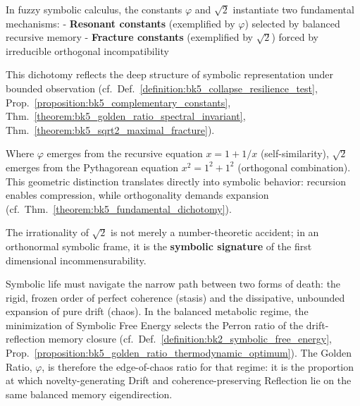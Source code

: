 \begin{theorem}
\label{theorem:bk5_fundamental_dichotomy}
In fuzzy symbolic calculus, the constants $\varphi$ and $\sqrt{2}$ instantiate two fundamental mechanisms:
- \textbf{Resonant constants} (exemplified by $\varphi$) selected by balanced recursive memory
- \textbf{Fracture constants} (exemplified by $\sqrt{2}$) forced by irreducible orthogonal incompatibility

This dichotomy reflects the deep structure of symbolic representation under bounded observation (cf.~Def.~\ref{definition:bk5_collapse_resilience_test}, Prop.~\ref{proposition:bk5_complementary_constants}, Thm.~\ref{theorem:bk5_golden_ratio_spectral_invariant}, Thm.~\ref{theorem:bk5_sqrt2_maximal_fracture}).
\end{theorem}

\begin{demonstratio}
\label{demonstratio:bk5_diagonal_dissociation}
Where $\varphi$ emerges from the recursive equation $x = 1 + 1/x$ (self-similarity), $\sqrt{2}$ emerges from the Pythagorean equation $x^2 = 1^2 + 1^2$ (orthogonal combination). This geometric distinction translates directly into symbolic behavior: recursion enables compression, while orthogonality demands expansion (cf.~Thm.~\ref{theorem:bk5_fundamental_dichotomy}).

The irrationality of $\sqrt{2}$ is not merely a number-theoretic accident; in an orthonormal symbolic frame, it is the \textbf{symbolic signature} of the first dimensional incommensurability.
\end{demonstratio}

\begin{scholium}
\label{scholium:bk5_life_on_edge_of_chaos}
Symbolic life must navigate the narrow path between two forms of death: the rigid, frozen order of perfect coherence (stasis) and the dissipative, unbounded expansion of pure drift (chaos). In the balanced metabolic regime, the minimization of Symbolic Free Energy selects the Perron ratio of the drift-reflection memory closure (cf.~Def.~\ref{definition:bk2_symbolic_free_energy}, Prop.~\ref{proposition:bk5_golden_ratio_thermodynamic_optimum}). The Golden Ratio, $\varphi$, is therefore the edge-of-chaos ratio for that regime: it is the proportion at which novelty-generating Drift and coherence-preserving Reflection lie on the same balanced memory eigendirection.
\end{scholium}

